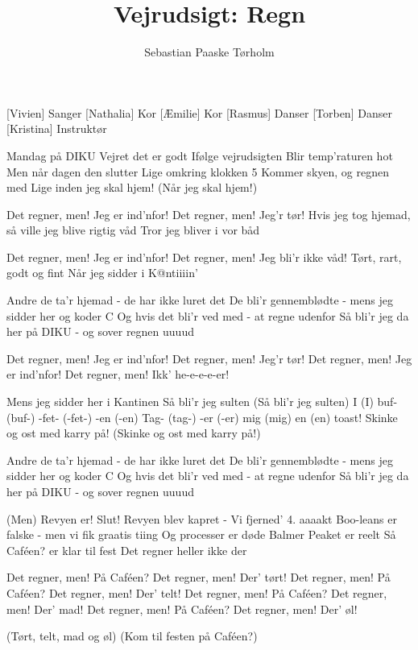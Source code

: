 \documentclass[a4paper,11pt]{article}
\title{Vejrudsigt: Regn}
\author{Sebastian Paaske Tørholm}
\begin{document}
\maketitle

\begin{roles}
[Vivien] Sanger
[Nathalia] Kor
[Æmilie] Kor
[Rasmus] Danser
[Torben] Danser
[Kristina] Instruktør
\end{roles}

\begin{song}

%
Mandag på DIKU
Vejret det er godt
Ifølge vejrudsigten
Blir temp'raturen hot
Men når dagen den slutter
Lige omkring klokken 5
Kommer skyen, og regnen med
Lige inden jeg skal hjem! (Når jeg skal hjem!)

Det regner, men! Jeg er ind'nfor!
Det regner, men! Jeg'r tør!
Hvis jeg tog hjemad, så ville jeg blive rigtig våd
Tror jeg bliver i vor båd 

Det regner, men! Jeg er ind'nfor!
Det regner, men! Jeg bli'r ikke våd!
Tørt, rart, godt og fint
Når jeg sidder i K@ntiiiin'

Andre de ta'r hjemad - de har ikke luret det
De bli'r gennemblødte - mens jeg sidder her og koder C
Og hvis det bli'r ved med - at regne udenfor
Så bli'r jeg da her på DIKU - og sover regnen uuuud

Det regner, men! Jeg er ind'nfor!
Det regner, men! Jeg'r tør!
Det regner, men! Jeg er ind'nfor!
Det regner, men! Ikk' he-e-e-e-er!

Mens jeg sidder her i Kantinen
Så bli'r jeg sulten (Så bli'r jeg sulten)
I (I) buf- (buf-) -fet- (-fet-) -en (-en)
Tag- (tag-) -er (-er) mig (mig) en (en) toast!
Skinke og ost med karry på!
(Skinke og ost med karry på!)

Andre de ta'r hjemad - de har ikke luret det
De bli'r gennemblødte - mens jeg sidder her og koder C
Og hvis det bli'r ved med - at regne udenfor
Så bli'r jeg da her på DIKU - og sover regnen uuuud

(Men) Revyen er! Slut!
Revyen blev kapret - Vi fjerned’ 4. aaaakt
Boo-leans er falske - men vi fik graatis tiing
Og processer er døde
Balmer Peaket er reelt
Så Caféen? er klar til fest
Det regner heller ikke der

Det regner, men! På Caféen?
Det regner, men! Der’ tørt!
Det regner, men! På Caféen?
Det regner, men! Der’ telt!
Det regner, men! På Caféen?
Det regner, men! Der’ mad!
Det regner, men! På Caféen?
Det regner, men! Der’ øl!

(Tørt, telt, mad og øl)
(Kom til festen på Caféen?)

\end{song}
\end{document}
